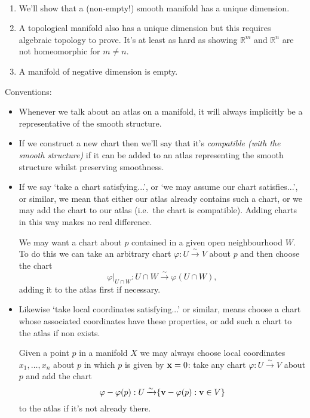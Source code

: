 \documentclass[a4paper,11pt]{article}
\begin{document}
	\begin{rmk} \ 
		\begin{enumerate}
			\item We'll show that a (non-empty!) smooth manifold has a unique dimension.
			\item A topological manifold also has a unique dimension but this requires algebraic topology to prove. It's at least as hard as showing $\mathbb{R}^m$ and $\mathbb{R}^n$ are not homeomorphic for $m \neq n$.
			\item A manifold of negative dimension is empty.
		\end{enumerate}
	\end{rmk}

	Conventions:
	\begin{itemize}
		\item Whenever we talk about an atlas on a manifold, it will always implicitly be a representative of the smooth structure.
		\item If we construct a new chart then we'll say that it's \emph{compatible (with the smooth structure)} if it can be added to an atlas representing the smooth structure whilst preserving smoothness.
		\item If we say `take a chart satisfying...', or `we may assume our chart satisfies...', or similar, we mean that either our atlas already contains such a chart, or we may add the chart to our atlas (i.e.\ the chart is compatible). Adding charts in this way makes no real difference.
		\begin{ex}
			We may want a chart about $p$ contained in a given open neighbourhood $W$. To do this we can take an arbitrary chart $\varphi: U \xrightarrow{\sim} V$ about $p$ and then choose the chart
			\[
				\varphi|_{U\cap W} : U \cap W \xrightarrow{\sim} \varphi(U \cap W),
			\]
			adding it to the atlas first if necessary. 
		\end{ex}
		\item Likewise `take local coordinates satisfying...' or similar, means choose a chart whose associated coordinates have these properties, or add such a chart to the atlas if non exists.
		\begin{ex}
			Given a point $p$ in a manifold $X$ we may always choose local coordinates $x_1, \dots, x_n$ about $p$ in which $p$ is given by $\vb{x} = 0$: take any chart $\varphi: U \xrightarrow{\sim} V$ about $p$ and add the chart
			\[
				\varphi - \varphi(p): U \operatorname{\xrightarrow{\sim}} \{\vb{v} - \varphi(p): \vb{v}\in V\}
			\]
			 to the atlas if it's not already there.
		\end{ex}
	\end{itemize}
\end{document}
